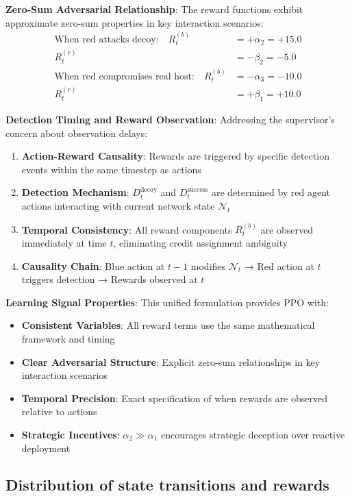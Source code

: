 \documentclass[12pt,twoside]{article}
\begin{document}
\textbf{Zero-Sum Adversarial Relationship}:
The reward functions exhibit approximate zero-sum properties in key interaction scenarios:
\begin{align}
\text{When red attacks decoy:} \quad R_t^{(b)} &= +\alpha_2 = +15.0 \\
R_t^{(r)} &= -\beta_2 = -5.0 \\
\text{When red compromises real host:} \quad R_t^{(b)} &= -\alpha_3 = -10.0 \\
R_t^{(r)} &= +\beta_1 = +10.0
\end{align}

\textbf{Detection Timing and Reward Observation}:
Addressing the supervisor's concern about observation delays:
\begin{enumerate}
\item \textbf{Action-Reward Causality}: Rewards are triggered by specific detection events within the same timestep as actions
\item \textbf{Detection Mechanism}: $D_t^{\text{decoy}}$ and $D_t^{\text{success}}$ are determined by red agent actions interacting with current network state $\mathcal{N}_t$
\item \textbf{Temporal Consistency}: All reward components $R_t^{(b)}$ are observed immediately at time $t$, eliminating credit assignment ambiguity
\item \textbf{Causality Chain}: Blue action at $t-1$ modifies $\mathcal{N}_t$ → Red action at $t$ triggers detection → Rewards observed at $t$
\end{enumerate}

\textbf{Learning Signal Properties}:
This unified formulation provides PPO with:
\begin{itemize}
\item \textbf{Consistent Variables}: All reward terms use the same mathematical framework and timing
\item \textbf{Clear Adversarial Structure}: Explicit zero-sum relationships in key interaction scenarios
\item \textbf{Temporal Precision}: Exact specification of when rewards are observed relative to actions
\item \textbf{Strategic Incentives}: $\alpha_2 \gg \alpha_1$ encourages strategic deception over reactive deployment
\end{itemize}

\subsection{Distribution of state transitions and rewards}
\end{document}
